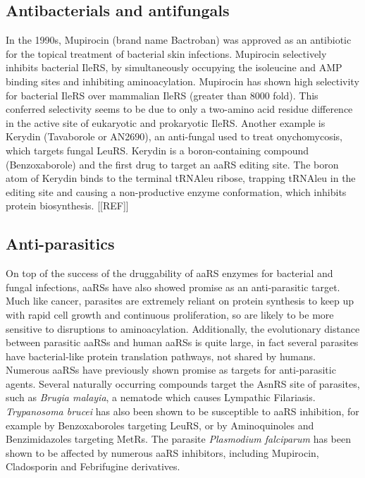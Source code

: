 \subsection{Antibacterials and antifungals}
In the 1990s, Mupirocin (brand name Bactroban) was approved as an antibiotic for the topical treatment of bacterial skin infections.
Mupirocin selectively inhibits bacterial IleRS, by simultaneously occupying the isoleucine and AMP binding sites and inhibiting aminoacylation\cite{hurdle2005prospects}.
Mupirocin has shown high selectivity for bacterial IleRS over mammalian IleRS (greater than 8000 fold)\cite{hughes1980interaction}.
This conferred selectivity seems to be due to only a two-amino acid residue difference in the active site of eukaryotic and prokaryotic IleRS\cite{nakama2001structural}.
Another example is Kerydin (Tavaborole or AN2690), an anti-fungal used to treat onychomycosis, which targets fungal LeuRS.
Kerydin is a boron-containing compound (Benzoxaborole) and the first drug to target an aaRS editing site.
The boron atom of Kerydin binds to the terminal tRNAleu ribose, trapping tRNAleu in the editing site and causing a non-productive enzyme conformation, which inhibits protein biosynthesis. [[REF]]


\subsection{Anti-parasitics}
On top of the success of the druggability of aaRS enzymes for bacterial and fungal infections, aaRSs have also showed promise as an anti-parasitic target.
Much like cancer, parasites are extremely reliant on protein synthesis to keep up with rapid cell growth and continuous proliferation, so are likely to be more sensitive to disruptions to aminoacylation.
Additionally, the evolutionary distance between parasitic aaRSs and human aaRSs is quite large, in fact several parasites have bacterial-like protein translation pathways, not shared by humans\cite{pham2014aminoacyl}.
Numerous aaRSs have previously shown promise as targets for anti-parasitic agents.
Several naturally occurring compounds target the AsnRS site of parasites, such as \textit{Brugia malayia}, a nematode which causes Lympathic Filariasis.
\textit{Trypanosoma brucei} has also been shown to be susceptible to aaRS inhibition, for example by Benzoxaboroles targeting LeuRS, or by Aminoquinoles and
Benzimidazoles targeting MetRs.
The parasite \textit{Plasmodium falciparum} has been shown to be affected by numerous aaRS inhibitors, including Mupirocin, Cladosporin and Febrifugine derivatives.

